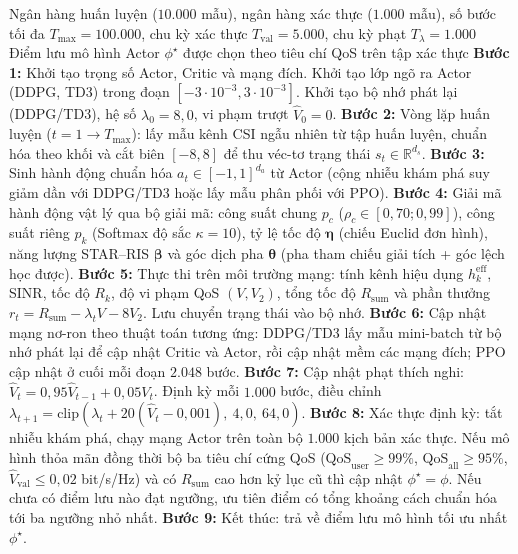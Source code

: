 \begin{algorithm}[htbp]
\caption{Quy trình huấn luyện tổng quát nhóm DRL với bộ giải mã hành động}
\label{alg:huan-luyen-drl}
\begin{algorithmic}[1]
\Require Ngân hàng huấn luyện ($10.000$ mẫu), ngân hàng xác thực ($1.000$ mẫu), số bước tối đa
  $T_{\max} = 100.000$, chu kỳ xác thực $T_{\mathrm{val}} = 5.000$, chu kỳ phạt $T_\lambda = 1.000$
\Ensure Điểm lưu mô hình Actor $\phi^\star$ được chọn theo tiêu chí QoS trên tập xác thực
\State \textbf{Bước 1:} Khởi tạo trọng số Actor, Critic và mạng đích. Khởi tạo lớp ngõ ra Actor (DDPG, TD3) trong
  đoạn $[-3 \cdot 10^{-3}, 3 \cdot 10^{-3}]$. Khởi tạo bộ nhớ phát lại (DDPG/TD3), hệ số $\lambda_0 = 8,0$, vi phạm
  trượt $\hat{V}_0 = 0$.
\State \textbf{Bước 2:} Vòng lặp huấn luyện ($t = 1 \to T_{\max}$): lấy mẫu kênh CSI ngẫu nhiên từ tập huấn luyện,
  chuẩn hóa theo khối và cắt biên $[-8, 8]$ để thu véc-tơ trạng thái $s_t \in \mathbb{R}^{d_s}$.
\State \textbf{Bước 3:} Sinh hành động chuẩn hóa $a_t \in [-1, 1]^{d_a}$ từ Actor (cộng nhiễu khám phá suy giảm dần
  với DDPG/TD3 hoặc lấy mẫu phân phối với PPO).
\State \textbf{Bước 4:} Giải mã hành động vật lý qua bộ giải mã: công suất chung $p_c$ ($\rho_c \in [0,70; 0,99]$),
  công suất riêng $p_k$ (Softmax độ sắc $\kappa = 10$), tỷ lệ tốc độ $\boldsymbol{\eta}$ (chiếu Euclid đơn hình),
  năng lượng STAR--RIS $\boldsymbol{\beta}$ và góc dịch pha $\boldsymbol{\theta}$ (pha tham chiếu giải tích + góc
  lệch học được).
\State \textbf{Bước 5:} Thực thi trên môi trường mạng: tính kênh hiệu dụng $h^{\mathrm{eff}}_k$, SINR, tốc độ
  $R_k$, độ vi phạm QoS $(V, V_2)$, tổng tốc độ $R_{\mathrm{sum}}$ và phần thưởng
  $r_t = R_{\mathrm{sum}} - \lambda_t V - 8V_2$. Lưu chuyển trạng thái vào bộ nhớ.
\State \textbf{Bước 6:} Cập nhật mạng nơ-ron theo thuật toán tương ứng: DDPG/TD3 lấy mẫu mini-batch từ bộ nhớ
  phát lại để cập nhật Critic và Actor, rồi cập nhật mềm các mạng đích; PPO cập nhật ở cuối mỗi đoạn $2.048$ bước.
\State \textbf{Bước 7:} Cập nhật phạt thích nghi: $\hat{V}_t = 0,95\hat{V}_{t-1} + 0,05 V_t$. Định kỳ mỗi $1.000$
  bước, điều chỉnh $\lambda_{t+1} = \mathrm{clip}(\lambda_t + 20(\hat{V}_t - 0,001),\ 4,0,\ 64,0)$.
\State \textbf{Bước 8:} Xác thực định kỳ: tắt nhiễu khám phá, chạy mạng Actor trên toàn bộ $1.000$ kịch bản xác
  thực. Nếu mô hình thỏa mãn đồng thời bộ ba tiêu chí cứng QoS ($\mathrm{QoS}_{\mathrm{user}} \ge 99\%$,
  $\mathrm{QoS}_{\mathrm{all}} \ge 95\%$, $\hat{V}_{\mathrm{val}} \le 0,02$ bit/s/Hz) và có $R_{\mathrm{sum}}$ cao
  hơn kỷ lục cũ thì cập nhật $\phi^\star = \phi$. Nếu chưa có điểm lưu nào đạt ngưỡng, ưu tiên điểm có tổng khoảng
  cách chuẩn hóa tới ba ngưỡng nhỏ nhất.
\State \textbf{Bước 9:} Kết thúc: trả về điểm lưu mô hình tối ưu nhất $\phi^\star$.
\end{algorithmic}
\end{algorithm}

